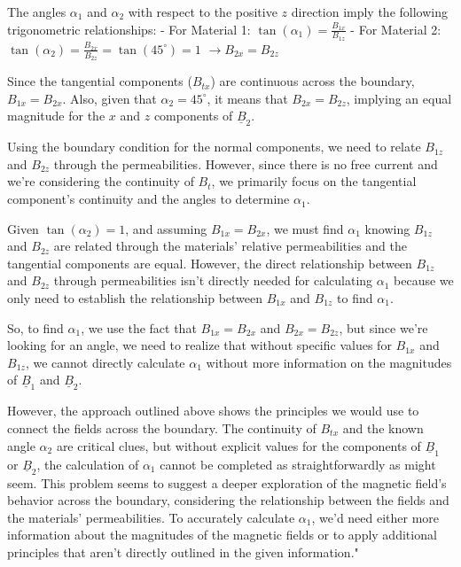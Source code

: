 The angles \( \alpha_{1} \) and \( \alpha_{2} \) with respect to the positive \(z\) direction imply the following trigonometric relationships:
- For Material 1: \( \tan(\alpha_{1}) = \frac{B_{1x}}{B_{1z}} \)
- For Material 2: \( \tan(\alpha_{2}) = \frac{B_{2x}}{B_{2z}} = \tan(45^\circ) = 1 \) \( \rightarrow B_{2x} = B_{2z} \)

Since the tangential components (\(B_{tx}\)) are continuous across the boundary, \( B_{1x} = B_{2x} \). Also, given that \( \alpha_{2} = 45^\circ \), it means that \( B_{2x} = B_{2z} \), implying an equal magnitude for the \(x\) and \(z\) components of \( \underline{B}_{2} \).

Using the boundary condition for the normal components, we need to relate \(B_{1z}\) and \(B_{2z}\) through the permeabilities. However, since there is no free current and we're considering the continuity of \(B_{t}\), we primarily focus on the tangential component's continuity and the angles to determine \( \alpha_{1} \).

Given \( \tan(\alpha_{2}) = 1 \), and assuming \(B_{1x} = B_{2x}\), we must find \( \alpha_{1} \) knowing \(B_{1z}\) and \(B_{2z}\) are related through the materials' relative permeabilities and the tangential components are equal. However, the direct relationship between \(B_{1z}\) and \(B_{2z}\) through permeabilities isn't directly needed for calculating \( \alpha_{1} \) because we only need to establish the relationship between \(B_{1x}\) and \(B_{1z}\) to find \( \alpha_{1} \).

So, to find \( \alpha_{1} \), we use the fact that \(B_{1x} = B_{2x}\) and \(B_{2x} = B_{2z}\), but since we're looking for an angle, we need to realize that without specific values for \(B_{1x}\) and \(B_{1z}\), we cannot directly calculate \( \alpha_{1} \) without more information on the magnitudes of \( \underline{B}_{1} \) and \( \underline{B}_{2} \).

However, the approach outlined above shows the principles we would use to connect the fields across the boundary. The continuity of \(B_{tx}\) and the known angle \( \alpha_{2} \) are critical clues, but without explicit values for the components of \( \underline{B}_{1} \) or \( \underline{B}_{2} \), the calculation of \( \alpha_{1} \) cannot be completed as straightforwardly as might seem. This problem seems to suggest a deeper exploration of the magnetic field's behavior across the boundary, considering the relationship between the fields and the materials' permeabilities. To accurately calculate \( \alpha_{1} \), we'd need either more information about the magnitudes of the magnetic fields or to apply additional principles that aren't directly outlined in the given information."

